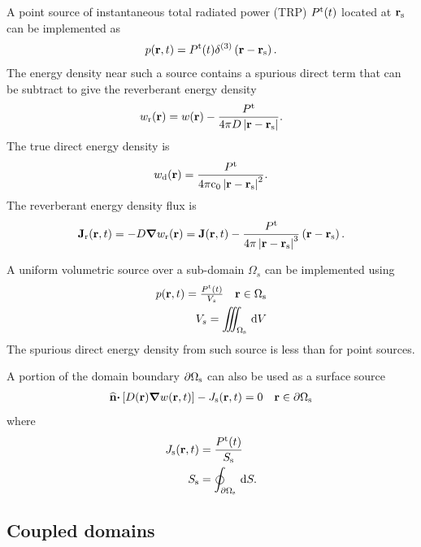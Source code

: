 \documentclass[a4paper]{article}
\numberwithin{equation}{section}
\providecommand\oiint{\oint}
\begin{document}
A point source of instantaneous total radiated power (TRP) $P^\rt(t)$
located at $\vr_\rs$ can be implemented as
\begin{align}
p\prt = P^\rt(t) \delta^{(3)}\left(\vr-\vr_\rs\right).
\end{align}
The energy density near such a source contains a spurious direct term that can
be subtract to give the reverberant energy density
\begin{align}
w_\rr\pr = w\pr - \frac{P^\rt}{4\pi D\left|\vr-\vr_\rs\right|}.
\end{align}
The true direct energy density is
\begin{align}
w_\rd\pr = \frac{P^\rt}{4\pi\rc_0\left|\vr-\vr_\rs\right|^2}.
\end{align}
The reverberant energy density flux is
\begin{align}
\vJ_\rr\prt = -D\vnabla w_\rr\pr = \vJ\prt - \frac{P^\rt}{4\pi\left|\vr-\vr_\rs\right|^3}\left(\vr-\vr_\rs\right).
\end{align}

A uniform volumetric source over a sub-domain $\Omega _s$ can be implemented
using
\begin{align}
\begin{matrix} 
p\prt = \frac{P^\rt(t)}{V_s} &\vr\in\Omega_\rs 
\end{matrix} \\
V_s = \iiint_{\Omega_\rs}\dif{V}
\end{align}
The spurious direct energy density from such source is less than for point
sources.

A portion of the domain boundary $\partial\Omega_\rs$ can also be used as a
surface source
\begin{align}
\begin{matrix}
\uvn\vcdot\left[D\pr\vnabla w\prt\right] - J_\rs\prt = 0 &\vr\in\partial\Omega_\rs
\end{matrix}
\end{align}
where
\begin{align}
J_\rs\prt &= \frac{P^\rt(t)}{S_\rs} \\
S_\rs &= \oiint_{\partial\Omega_\rs}\dif{S} .
\end{align}

\subsection[Coupled domains]{Coupled domains}
\label{sc:sum:coup}
\end{document}

